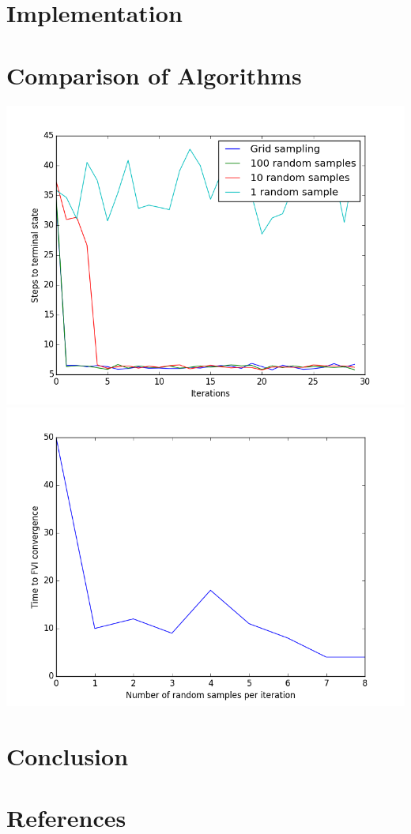 \documentclass[a4paper, 12pt]{article}
\begin{document}
\section*{Implementation} 

\section*{Comparison of Algorithms}
\includegraphics[scale=0.7]{convergence.png}
\includegraphics[scale=0.7]{n_samples.png}

\section*{Conclusion}

\section*{References}
%
%
\end{document}
